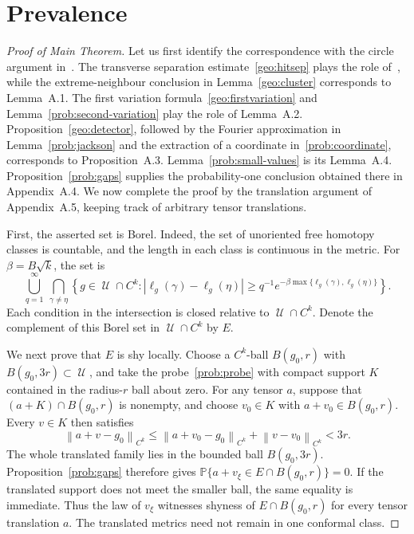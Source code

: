 \documentclass[10pt,oneside,reqno]{amsproc}
\numberwithin{equation}{section}
\theoremstyle{definition}
\theoremstyle{remark}
\newcommand{\norm}[1]{\left\|#1\right\|}
\DeclareMathOperator{\cU}{{\mathscr U}}
\renewcommand{\ge}{\geqslant}
\renewcommand{\le}{\leqslant}
\begin{document}
\section{Prevalence}
\label{prob:prevalence-section}

\begin{proof}[Proof of Main Theorem]
Let us first identify the correspondence with the circle argument in~\cite[Appendix A]{DK}. The transverse separation estimate~\eqref{geo:hitsep} plays the role of~\cite[Lemma~3.3]{DK}, while the extreme-neighbour conclusion in Lemma~\ref{geo:cluster} corresponds to Lemma~A.1. The first variation formula~\eqref{geo:firstvariation} and Lemma~\ref{prob:second-variation} play the role of Lemma~A.2. Proposition~\ref{geo:detector}, followed by the Fourier approximation in Lemma~\ref{prob:jackson} and the extraction of a coordinate in~\eqref{prob:coordinate}, corresponds to Proposition~A.3. Lemma~\ref{prob:small-values} is its Lemma~A.4. Proposition~\ref{prob:gaps} supplies the probability-one conclusion obtained there in Appendix~A.4. We now complete the proof by the translation argument of Appendix~A.5, keeping track of arbitrary tensor translations.

First, the asserted set is Borel. Indeed, the set of unoriented free homotopy classes is countable, and the length in each class is continuous in the metric. For $\beta=B\sqrt{k}$, the set is
\[
 \bigcup_{q=1}^\infty\ \bigcap_{\gamma\ne\eta}\left\{g\in\cU\cap C^k:|\ell_g(\gamma)-\ell_g(\eta)|\ge q^{-1}e^{-\beta\max\{\ell_g(\gamma),\ell_g(\eta)\}}\right\}.
\]
Each condition in the intersection is closed relative to $\cU\cap C^k$. Denote the complement of this Borel set in $\cU\cap C^k$ by $E$.

We next prove that $E$ is shy locally. Choose a $C^k$-ball $B(g_0,r)$ with $B(g_0,3r)\subset\cU$, and take the probe~\eqref{prob:probe} with compact support $K$ contained in the radius-$r$ ball about zero. For any tensor $a$, suppose that $(a+K)\cap B(g_0,r)$ is nonempty, and choose $v_0\in K$ with $a+v_0\in B(g_0,r)$. Every $v\in K$ then satisfies
\[
 \norm{a+v-g_0}_{C^k}\le\norm{a+v_0-g_0}_{C^k}+\norm{v-v_0}_{C^k}<3r.
\]
The whole translated family lies in the bounded ball $B(g_0,3r)$. Proposition~\ref{prob:gaps} therefore gives $\mathbb P\{a+v_\xi\in E\cap B(g_0,r)\}=0$. If the translated support does not meet the smaller ball, the same equality is immediate. Thus the law of $v_\xi$ witnesses shyness of $E\cap B(g_0,r)$ for every tensor translation $a$. The translated metrics need not remain in one conformal class.


\end{proof}
\end{document}
